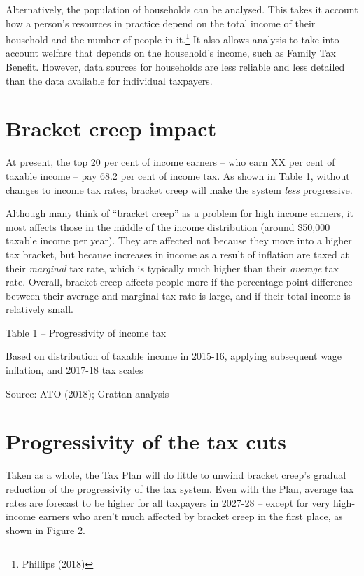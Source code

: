 \documentclass[submission]{grattan}\usepackage[]{graphicx}\usepackage[]{color}
\begin{document}
Alternatively, the population of households can be analysed. This takes it account how a person's resources in practice depend on the total income of their household and the number of people in it.\footnote{Phillips (2018)} It also allows analysis to take into account welfare that depends on the household's income, such as Family Tax Benefit. However, data sources for households are less reliable and less detailed than the data available for individual taxpayers.

\section{Bracket creep impact}\label{sec:bracket-creep-impact}

At present, the top 20 per cent of income earners -- who earn XX per cent of taxable income -- pay 68.2 per cent of income tax. As shown in Table 1, without changes to income tax rates, bracket creep will make the system \emph{less} progressive.

Although many think of ``bracket creep'' as a problem for high income earners, it most affects those in the middle of the income distribution (around \$50,000 taxable income per year). They are affected not because they move into a higher tax bracket, but because increases in income as a result of inflation are taxed at their \emph{marginal} tax rate, which is typically much higher than their \emph{average} tax rate. Overall, bracket creep affects people more if the percentage point difference between their average and marginal tax rate is large, and if their total income is relatively small.

Table 1 -- Progressivity of income tax



Based on distribution of taxable income in 2015-16, applying subsequent wage inflation, and 2017-18 tax scales

Source: ATO (2018); Grattan analysis

\section{Progressivity of the tax cuts}\label{sec:progressivity-of-the-tax-cuts}

Taken as a whole, the Tax Plan will do little to unwind bracket creep's gradual reduction of the progressivity of the tax system. Even with the Plan, average tax rates are forecast to be higher for all taxpayers in 2027-28 -- except for very high-income earners who aren't much affected by bracket creep in the first place, as shown in Figure 2.
\end{document}
